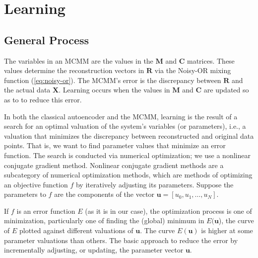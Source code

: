\section{Learning}
\label{sec:mcmm-learning}

\subsection{General Process}\label{sec:general}

The variables in an MCMM are the values in the $\mathbf{M}$ and $\mathbf{C}$ matrices. 
These values determine the 
reconstruction vectors in $\mathbf{R}$ via the Noisy-OR mixing function (\eqref{eq:noisy-or}). 
The MCMM's error is the discrepancy between  
$\mathbf{R}$ and the actual data $\mathbf{X}$. Learning occurs when the values in $\mathbf{M}$
and $\mathbf{C}$ are updated so as to to reduce this error. 
 
In both the classical autoencoder and the MCMM, learning is the result of a search for an optimal valuation of the system's variables (or parameters), 
i.e., a valuation that minimizes 
the discrepancy between
reconstructed and original data points. That is, we want to find parameter 
values that minimize an error function. The search is conducted
via %
numerical optimization; 
we use a nonlinear conjugate gradient method.
Nonlinear conjugate gradient methods are a subcategory 
of numerical optimization methods, which are methods of 
optimizing an objective function $f$ by iteratively adjusting its parameters. 
Suppose the parameters to $f$ are the components of the vector $\mathbf{u} = [u_0,u_1, \dots, u_N]$.
 
If $f$ is an error function $E$ (as it is in our case), the optimization process is one of minimization, 
particularly one of finding the (global) minimum in $E(\mathbf{u}$), the curve of $E$ 
plotted against different valuations of $\mathbf{u}$.
The curve $E(\mathbf{u})$ is higher at some parameter valuations than others. 
The basic approach to reduce the error by incrementally adjusting, or updating, the parameter vector $\mathbf{u}$. 

